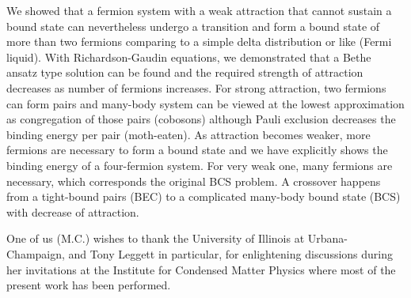 \documentclass[5p,twocolumn]{elsarticle}
\begin{document}
We showed that a fermion system with a weak attraction that cannot sustain a bound state can nevertheless undergo a transition and form a bound state of more than two fermions comparing to a simple delta distribution or like (Fermi liquid).  With Richardson-Gaudin equations, we demonstrated that a Bethe ansatz type solution can be found and the required strength of attraction decreases as number of fermions increases.  For strong attraction, two fermions can form pairs and many-body system can be viewed at the lowest approximation as congregation of those pairs (cobosons) although Pauli exclusion decreases the binding energy per pair (moth-eaten).  As attraction becomes weaker, more fermions are necessary to form a bound state and we have explicitly shows the binding energy of a four-fermion system.  For very weak one, many fermions are necessary, which corresponds the original BCS problem.   A crossover happens from a tight-bound pairs (BEC) to a complicated many-body bound state (BCS) with decrease of attraction.  

One of us (M.C.) wishes to thank the University of Illinois at
Urbana-Champaign, and Tony Leggett in particular, for enlightening discussions during her invitations at
the Institute for Condensed Matter Physics where most of the present work has been
performed. 
 
\end{document}
